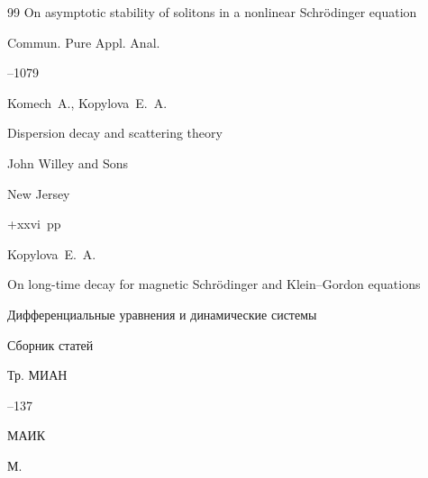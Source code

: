 \begin{thebibliography}{99}
\paper On asymptotic stability of solitons in a nonlinear Schrödinger equation

\jour Commun. Pure Appl. Anal.



--1079 






\by  Komech~A., Kopylova~E.~A. 

\book Dispersion decay and scattering theory


\publ John Willey and Sons

\publaddr New Jersey


+xxvi~pp \nofrills





\by Kopylova~E.~A.

\paper On long-time decay for magnetic Schr\"odinger and Klein--Gordon equations

\inbook Дифференциальные уравнения и динамические системы

\bookinfo Сборник статей

\serial Тр. МИАН



--137

\publ МАИК

\publaddr М.











\end{thebibliography}
